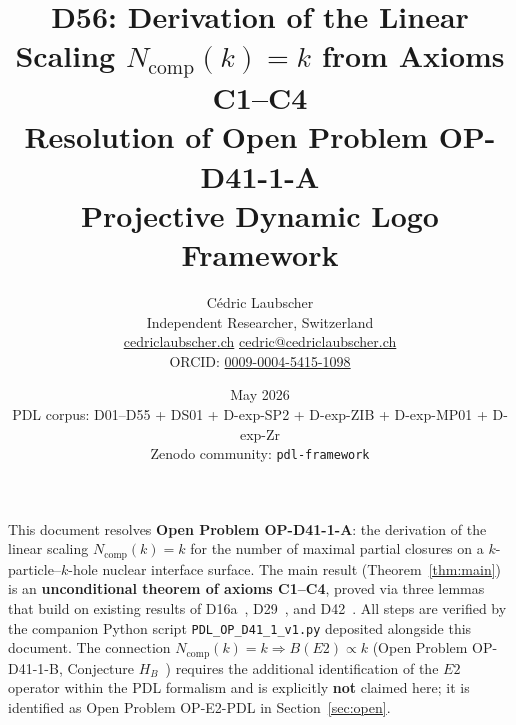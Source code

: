 \documentclass[11pt,a4paper]{article}
\theoremstyle{definition}
\theoremstyle{remark}
\newcommand{\Ncomp}{N_{\mathrm{comp}}}
\begin{document}
\title{\textbf{D56: Derivation of the Linear Scaling $\Ncomp(k) = k$
from Axioms C1--C4}\\[8pt]
{\large Resolution of Open Problem OP-D41-1-A}\\[6pt]
{\normalsize Projective Dynamic Logo Framework}}

\author{C\'edric Laubscher\\[4pt]
\small Independent Researcher, Switzerland\\
\small \href{https://cedriclaubscher.ch}{cedriclaubscher.ch}\quad
\href{mailto:cedric@cedriclaubscher.ch}{cedric@cedriclaubscher.ch}\\
\small ORCID: \href{https://orcid.org/0009-0004-5415-1098}{0009-0004-5415-1098}}

\date{May 2026\\[4pt]
\small PDL corpus: D01--D55 + DS01 + D-exp-SP2 + D-exp-ZIB
      + D-exp-MP01 + D-exp-Zr\\
\small Zenodo community: \texttt{pdl-framework}}

\maketitle

\begin{epistemicbox}
This document resolves \textbf{Open Problem OP-D41-1-A}: the derivation of the linear scaling $\Ncomp(k) = k$ for the number of maximal partial closures on a $k$-particle--$k$-hole nuclear interface surface. The main result (Theorem~\ref{thm:main}) is an \textbf{unconditional theorem of axioms C1--C4}, proved via three lemmas that build on existing results of D16a~\cite{PDL_D16a}, D29~\cite{PDL_D29}, and D42~\cite{PDL_D42}. All steps are verified by the companion Python script \texttt{PDL\_OP\_D41\_1\_v1.py} deposited alongside this document. The connection $\Ncomp(k) = k \Rightarrow B(E2) \propto k$ (Open Problem OP-D41-1-B, Conjecture $H_B$~\cite{PDL_D41}) requires the additional identification of the $E2$ operator within the PDL formalism and is explicitly \textbf{not} claimed here; it is identified as Open Problem OP-E2-PDL in Section~\ref{sec:open}.
\end{epistemicbox}
\end{document}

